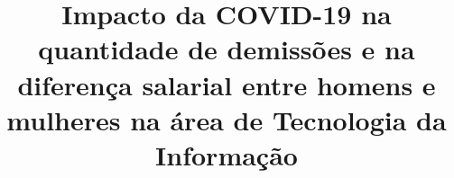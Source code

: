 \title{Impacto da COVID-19 na quantidade de demissões e na diferença salarial entre homens e mulheres na área de Tecnologia da Informação \\
}